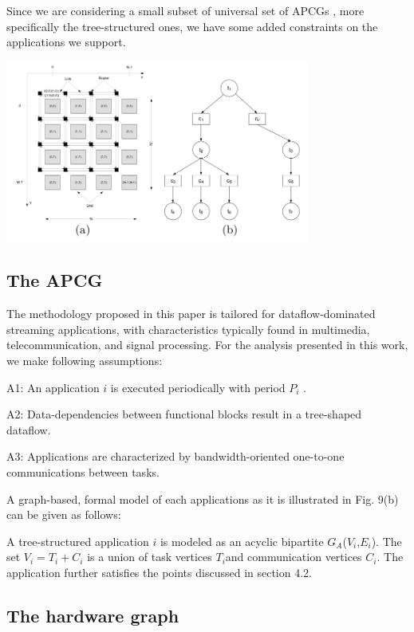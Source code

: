 Since we are considering a small subset of universal set of APCGs
, more specifically the tree-structured ones, we have some added constraints
on the applications we support.

\includegraphics[width=10cm]{images/7}%


\subsection{The APCG}

The methodology proposed in this paper is tailored for dataflow-dominated
streaming applications, with characteristics typically found in multimedia,
telecommunication, and signal processing. For the analysis presented
in this work, we make following assumptions:

A1: An application $i$ is executed periodically with period $P_{i}$
. 

A2: Data-dependencies between functional blocks result in a tree-shaped
dataflow. 

A3: Applications are characterized by bandwidth-oriented one-to-one
communications between tasks.

A graph-based, formal model of each applications as it is illustrated
in Fig. 9(b) can be given as follows: 

A tree-structured application $i$ is modeled as an acyclic bipartite
$G_{A}$($V_{i}$,$E_{i}$). The set $V_{i}=$$T_{i}+C_{i}$ is a
union of task vertices $T_{i}$and communication vertices $C_{i}$.
The application further satisfies the points discussed in section
4.2.


\subsection{The hardware graph}

